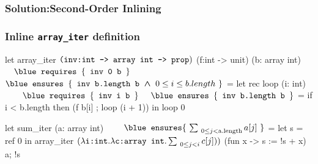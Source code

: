 \subsubsection*{Solution:Second-Order Inlining}
\begin{frame}[fragile]
\frametitle<1>
{Inline \texttt{array\_iter} definition}
\begin{footnotesize}
\begin{minipage}[t]{0.3\linewidth}

\begin{whycode} 
   let array_iter  $\color{black}\texttt{(inv:int -> array int -> prop})$ 
   (f:int -> unit) (b: array int)
	   $\Noir{\\ \hspace*{1em}\texttt{\blue requires }\{\texttt{ inv 0 b }\} }$
     $\Noir{\\ \hspace*{0em}\texttt{\blue ensures  }\{\texttt{ inv b.length b}\bwedge 0 \leq i \leq b.length~\}}$ 
   = let rec loop (i: int)
	   $\Noir{\hspace*{2em}\texttt{\blue requires }\{\texttt{ inv i b }\}}$
     $\Noir{\hspace*{1em}\texttt{\blue ensures  }\{\texttt{ inv b.length b }\}}$
      = if i < b.length 
       then (f b[i] ; loop (i + 1)) 
     in loop 0
  
   let sum_iter (a: array int) 
	$\hspace*{2em}\Noir{\texttt{\blue ensures}\{~\sum_{~0 \leq j < \text{a.length}} a[j]~\}}$
   =  let s = ref 0 in
     array_iter $\textcolor{black}{(\lambda \texttt{i:int}. \lambda \texttt{c:array int}. \sum_{~0\leq j < i} c[j]))}$
                (fun x -> s := !s + x) a; 
     !s
\end{whycode}
\end{minipage}
\end{footnotesize}
\end{frame}

\addtocounter{framenumber}{-1}
